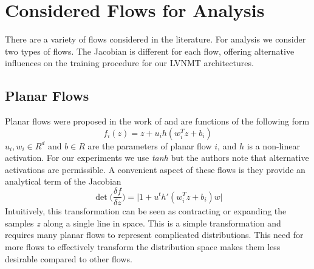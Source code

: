 \section{Considered Flows for Analysis}

There are a variety of flows considered in the literature. For analysis we consider two types of flows. The Jacobian is different for each flow, offering alternative influences on the training procedure for our \ac{LVNMT} architectures. 

\subsection{Planar Flows}

Planar flows were proposed in the work of \citet{rezende2015VIwithNF} and are functions of the following form
\begin{equation}
f_{i}(z) = z + u_{i} h(w_{i}^{T} z + b_{i})
\end{equation}
$u_{i}, w_{i} \in R^{d}$ and $b \in R$ are the parameters of planar flow $i$, and $h$ is a non-linear activation. For our experiments we use \textit{tanh} but the authors note that alternative activations are permissible. A convenient aspect of these flows is they provide an analytical term of the Jacobian
\begin{equation}
\det \bigg( \frac{\delta f}{\delta z} \bigg) = \bigg| 1 + u^{t} h'(w_{i}^{T} z + b_{i})w \bigg|
\end{equation} 
Intuitively, this transformation can be seen as contracting or expanding the samples $z$ along a single line in space. This is a simple transformation and requires many planar flows to represent complicated distributions. This need for more flows to effectively transform the distribution space makes them less desirable compared to other flows.  %





